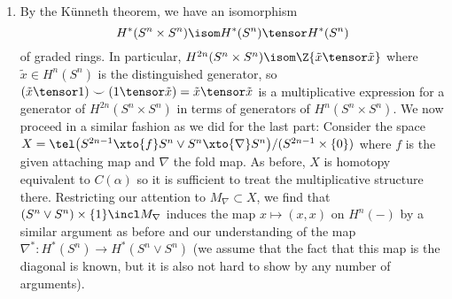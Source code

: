 \begin{solution}
\begin{enumerate}
		\item By the Künneth theorem, we have an isomorphism
			\begin{equation*}
				H^*(S^n \times S^n) \isom H^*(S^n) \tensor H^*(S^n)
			\end{equation*}
			of graded rings.
			In particular, $H^{2n}(S^n \times S^n) \isom \Z\{\tilde{x} \tensor \tilde{x}\}$ where $\tilde{x}\in H^n(S^n)$ is the distinguished generator, so $(\tilde{x} \tensor 1) \smile (1 \tensor \tilde{x}) = \tilde{x} \tensor \tilde{x}$ is a multiplicative expression for a generator of $H^{2n}(S^n \times S^n)$ in terms of generators of $H^n(S^n \times S^n)$.
			We now proceed in a similar fashion as we did for the last part:
			Consider the space $X = \tel\big(S^{2n - 1} \xto{f} S^n \vee S^n \xto{\nabla} S^n\big) / (S^{2n - 1} \times \{0\})$ where $f$ is the given attaching map and $\nabla$ the fold map.
			As before, $X$ is homotopy equivalent to $C(\alpha)$ so it is sufficient to treat the multiplicative structure there.
			Restricting our attention to $M_\nabla \subset X$, we find that $(S^n \vee S^n) \times \{1\} \incl M_\nabla$ induces the map $x \mapsto (x, x)$ on $H^n({{-}})$ by a similar argument as before and our understanding of the map $\nabla^*\colon H^*(S^n) \to H^*(S^n \vee S^n)$ (we assume that the fact that this map is the diagonal is known, but it is also not hard to show by any number of arguments).


\end{enumerate}
\end{solution}

